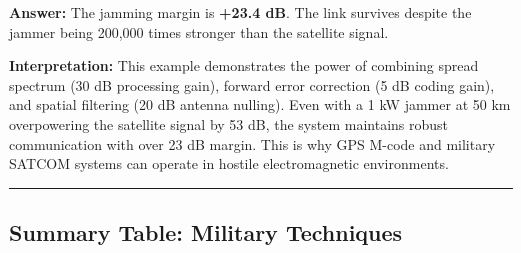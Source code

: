 \textbf{Answer:} The jamming margin is \textbf{+23.4 dB}. The link survives despite the jammer being 200,000 times stronger than the satellite signal.

\textbf{Interpretation:} This example demonstrates the power of combining spread spectrum (30 dB processing gain), forward error correction (5 dB coding gain), and spatial filtering (20 dB antenna nulling). Even with a 1 kW jammer at 50 km overpowering the satellite signal by 53 dB, the system maintains robust communication with over 23 dB margin. This is why GPS M-code and military SATCOM systems can operate in hostile electromagnetic environments.

\begin{center}\rule{0.5\linewidth}{0.5pt}\end{center}

\subsection{\texorpdfstring{ Summary Table: Military
Techniques}{ Summary Table: Military Techniques}}\label{summary-table-military-techniques}

